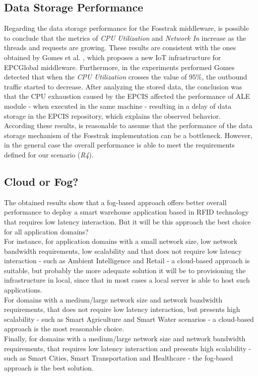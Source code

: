 \subsection{Data Storage Performance}
\label{subs:eval_results_data}
Regarding the data storage performance for the Fosstrak middleware, is possible to conclude that the metrics
of \textit{CPU Utilization} and \textit{Network In} increase as the threads and requests are growing.
These results are consistent with the ones obtained by Gomes et al. \cite{gomes2014future}, which
proposes a new \gls{IoT} infrastructure for \gls{EPC}Global middleware. Furthermore, in the experiments
performed Gomes detected that when the \textit{CPU Utilization} crosses the value of 95$\%$, the
outbound traffic started to decrease. After analyzing the stored data, the conclusion was that the
\gls{CPU} exhaustion caused by the \gls{EPCIS} affected the performance of \gls{ALE} module - when
executed in the same machine - resulting in a delay of data storage in the \gls{EPCIS} repository,
which explains the observed behavior.\\

According these results, is reasonable to assume that the performance of the data storage mechanism of
the Fosstrak implementation can be a bottleneck. However, in the general case the overall performance
is able to meet the requirements defined for our scenario (\textit{R4}).

\subsection{Cloud or Fog?}
\label{subs:eval_conclusion}
The obtained results show that a fog-based approach offers better overall performance to deploy a
smart warehouse application based in \gls{RFID} technology that requires low latency interaction.
But it will be this approach the best choice for all application domains?\\

For instance, for application domains with a small network size, low network bandwidth requirements,
low scalability and that does not require low latency interaction - such as Ambient Intelligence and
Retail - a cloud-based approach is suitable, but probably the more adequate solution it will be to
provisioning the infrastructure in local, since that in most cases a local server is able to host
such applications.\\

For domains with a medium/large network size and network bandwidth requirements, that does not require
low latency interaction, but presents high scalability - such as Smart Agriculture and Smart Water
scenarios - a cloud-based approach is the most reasonable choice.\\

Finally, for domains with a medium/large network size and network bandwidth requirements, that requires
low latency interaction and presents high scalability - such as Smart Cities, Smart Transportation and
Healthcare - the fog-based approach is the best solution.
